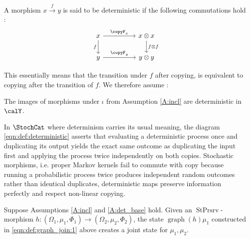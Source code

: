 \documentclass[12pt,oneside,pb-diagram]{article}
\DeclareMathOperator{\sps}{StPrsrv}
\DeclareMathOperator{\graph}{graph}
\begin{document}
\begin{definition} [Deterministic]
	A morphism $x\xrightarrow{f} y$ is said to be deterministic if the following commutations hold :
	\begin{equation} \label{eqn:def:deterministic}
		\begin{tikzcd}
			x \arrow{d}[swap]{f} \arrow{rr}{ \copyF_x } & & x\otimes x \arrow{d}{ f\otimes f } \\
			y \arrow{rr}{ \copyF_y } & & y\otimes y
		\end{tikzcd}
	\end{equation}
\end{definition}

This essentially means that the transition under $f$ after copying, is equivalent to copying after the transition of $f$. We therefore assume : 

\begin{Assumption} [Determinism] \label{A:det_base}
	The images of morphisms under $\iota$ from Assumption \ref{A:incl} are deterministic in $\calY$.
\end{Assumption}

\begin{Erg}{}{}
	In $\StochCat$ where determinism carries its usual meaning, the diagram \eqref{eqn:def:deterministic} asserts that evaluating a deterministic process once and duplicating its output yields the exact same outcome as duplicating the input first and applying the process twice independently on both copies. Stochastic morphisms, i.e. proper Markov kernels fail to commute with copy because running a probabilistic process twice produces independent random outcomes rather than identical duplicates, deterministic maps preserve information perfectly and respect non-linear copying. %
\end{Erg}

\begin{lemma} \label{lem:graph_join:1}
	Suppose Assumptions \ref{A:incl} and \ref{A:det_base} hold. Given an $\sps$-morphism $h : (\Omega_1, \mu_1, \Phi_1) \to (\Omega_2, \mu_2, \Phi_2)$, the state $\graph(h) \mu_1$ constructed in \eqref{eqn:def:graph_join:1} above creates a joint state for $\mu_1, \mu_2$.
\end{lemma}
\end{document}
